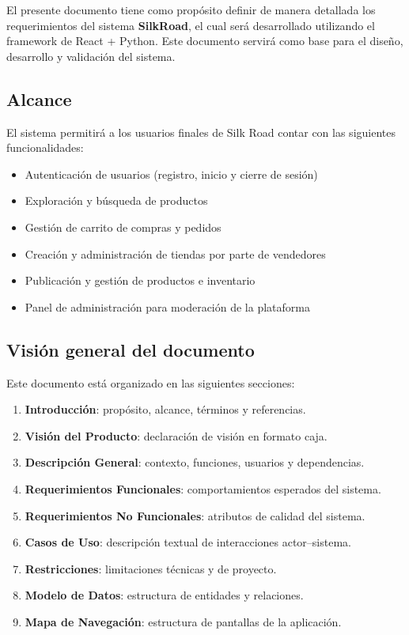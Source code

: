 \documentclass[12pt, letterpaper]{article}
\begin{document}
El presente documento tiene como propósito definir de manera detallada los requerimientos del sistema \textbf{SilkRoad}, el cual será desarrollado utilizando el framework de React + Python. Este documento servirá como base para el diseño, desarrollo y validación del sistema.

\subsection{Alcance}

El sistema permitirá a los usuarios finales de Silk Road contar con las siguientes funcionalidades:

\begin{itemize}
  \item Autenticación de usuarios (registro, inicio y cierre de sesión)
  \item Exploración y búsqueda de productos
  \item Gestión de carrito de compras y pedidos
  \item Creación y administración de tiendas por parte de vendedores
  \item Publicación y gestión de productos e inventario
  \item Panel de administración para moderación de la plataforma
\end{itemize}


\subsection{Visión general del documento}

Este documento está organizado en las siguientes secciones:

\begin{enumerate}
  \item \textbf{Introducción}: propósito, alcance, términos y referencias.
  \item \textbf{Visión del Producto}: declaración de visión en formato caja.
  \item \textbf{Descripción General}: contexto, funciones, usuarios y dependencias.
  \item \textbf{Requerimientos Funcionales}: comportamientos esperados del sistema.
  \item \textbf{Requerimientos No Funcionales}: atributos de calidad del sistema.
  \item \textbf{Casos de Uso}: descripción textual de interacciones actor--sistema.
  \item \textbf{Restricciones}: limitaciones técnicas y de proyecto.
  \item \textbf{Modelo de Datos}: estructura de entidades y relaciones.
  \item \textbf{Mapa de Navegación}: estructura de pantallas de la aplicación.
\end{enumerate}
\end{document}
